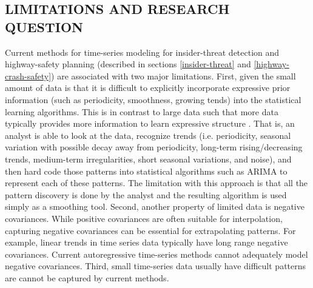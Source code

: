 \documentclass[letterpaper]{article}
\begin{document}
\subsection{LIMITATIONS AND RESEARCH QUESTION}\label{limitations-and-research-questions}

Current methods for time-series modeling for insider-threat detection and highway-safety planning (described in sections \ref{insider-threat} and \ref{highway-crash-safety}) are associated with two major limitations.  First, given the small amount of data is that it is difficult to explicitly incorporate expressive prior information (such as periodicity, smoothness, growing tends) into the statistical learning algorithms. This is in contrast to large data such that more data typically provides more information to learn expressive structure \citep{wilson2014covariance}. That is, an analyst is able to look at the data, recognize trends (i.e. periodicity, seasonal variation with possible decay away from periodicity, long-term rising/decreasing trends, medium-term irregularities, short seasonal variations, and noise), and then hard code those patterns into statistical algorithms such as ARIMA to represent each of these patterns. The limitation with this approach is that all the pattern discovery is done by the analyst and the resulting algorithm is used simply as a smoothing tool. Second, another property of limited data is negative covariances. While positive covariances are often suitable for interpolation, capturing negative covariances can be essential for extrapolating patterns. For example, linear trends in time series data typically have long range negative covariances. Current autoregressive time-series methods cannot adequately model negative covariances.  Third, small time-series data usually have difficult patterns are cannot be captured by current methods. %
\end{document}
